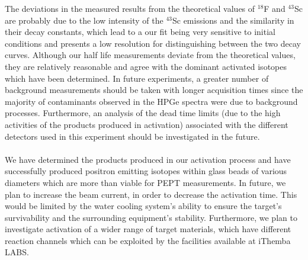 \documentclass[]{article}
\begin{document}
The deviations in the measured results from the theoretical values of ${}^{18}$F and ${}^{43}$Sc are probably due to the low intensity of the ${}^{43}$Sc emissions and the similarity in their decay constants, which lead to a our fit being very sensitive to initial conditions and presents a low resolution for distinguishing between the two decay curves. Although our half life measurements deviate from the theoretical values, they are relatively reasonable and agree with the dominant activated isotopes which have been determined. In future experiments, a greater number of background measurements should be taken with longer acquisition times since the majority of contaminants observed in the HPGe spectra were due to background processes. Furthermore, an analysis of the dead time limits (due to the high activities of the products produced in activation) associated with the different detectors used in this experiment should be investigated in the future.\\\\
We have determined the products produced in our activation process and have successfully produced positron emitting isotopes within glass beads of various diameters which are more than viable for PEPT measurements. In future, we plan to increase the beam current, in order to decrease the activation time. This would be limited by the water cooling system's ability to ensure the target's survivability and the surrounding equipment's stability. Furthermore, we plan to investigate activation of a wider range of target materials, which have different reaction channels which can be exploited by the facilities available at iThemba LABS.



\end{document}
